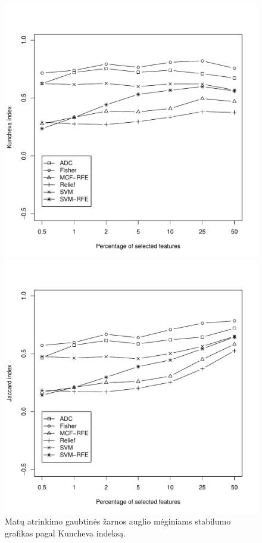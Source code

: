 \begin{figure}[H]
\begin{minipage}[b]{0.47\linewidth}
\centering
\includegraphics[width=.85\textwidth]{../bachelor/images/nncolon_robustness_kuncheva.pdf}
\caption{Matų atrinkimo gaubtinės žarnos auglio mėginiams stabilumo grafikas pagal Kuncheva indeksą.}
\label{fig:robk_colon}
\end{minipage}
\hspace{0.2cm}
\begin{minipage}[b]{0.47\linewidth}
\centering
\includegraphics[width=.85\textwidth]{../bachelor/images/nncolon_robustness_jaccard.pdf}

\end{minipage}
\end{figure}
